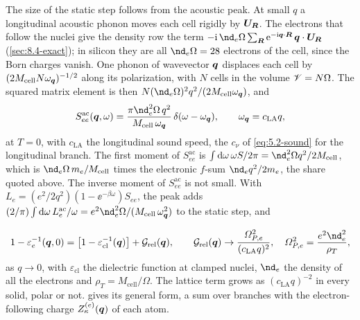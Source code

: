 The size of the static step follows from the acoustic peak. At small $q$ a longitudinal acoustic phonon moves each cell rigidly by $\bm{U}_{\bm{R}}$. The electrons that follow the nuclei give the density row the term $-\ii\,\nd_e\Omega\sum_{\vect{R}}\ee^{-\ii\vect{q}\cdot\vect{R}}\,\vect{q}\cdot\vect{U}_{\vect{R}}$ (\cref{sec:8.4-exact}); in silicon they are all $\nd_e\Omega = 28$ electrons of the cell, since the Born charges vanish. One phonon of wavevector $\bm{q}$ displaces each cell by $(2M_{\mathrm{cell}}N\omega_{\bm{q}})^{-1/2}$ along its polarization, with $N$ cells in the volume $\mathscr{V} = N\Omega$. The squared matrix element is then $N(\nd_e\Omega)^2q^2/(2M_{\mathrm{cell}}\omega_{\vect{q}})$, and
\begin{equation*}
  S_{ee}^{\mathrm{ac}}(\vect{q},\omega) = \frac{\pi\nd_e^2\Omega\,q^2}{M_{\mathrm{cell}}\,\omega_{\vect{q}}}\,\delta(\omega - \omega_{\vect{q}}) , \qquad \omega_{\vect{q}} = c_{\mathrm{LA}}q ,
\end{equation*}
at $T = 0$, with $c_{\mathrm{LA}}$ the longitudinal sound speed, the $c_\nu$ of \cref{eq:5.2-sound} for the longitudinal branch. The first moment of $S_{ee}^{\mathrm{ac}}$ is $\int\dd\omega\,\omega S/2\pi = \nd_e^2\Omega q^2/2M_{\mathrm{cell}}$, which is $\nd_e\Omega\,m_e/M_{\mathrm{cell}}$ times the electronic $f$-sum $\nd_eq^2/2m_e$, the share quoted above. The inverse moment of $S_{ee}^{\mathrm{ac}}$ is not small. With $L_e = (e^2/2q^2)(1 - \ee^{-\beta\omega})S_{ee}$, the peak adds $(2/\pi)\int\dd\omega\,L_e^{\mathrm{ac}}/\omega = e^2\nd_e^2\Omega/(M_{\mathrm{cell}}\,\omega_{\vect{q}}^2)$ to the static step, and
\begin{keyresult}
\begin{equation}
  1 - \varepsilon_e^{-1}(\vect{q},0) = \bigl[1 - \varepsilon_{\mathrm{cl}}^{-1}(\vect{q})\bigr] + \mathcal{G}_{\mathrm{rel}}(\vect{q}) , \qquad
  \mathcal{G}_{\mathrm{rel}}(\vect{q}) \to \frac{\varOmega_{P,e}^2}{(c_{\mathrm{LA}}q)^2} , \quad \varOmega_{P,e}^2 = \frac{e^2\nd_e^2}{\rho_T} ,
  \label{eq:10.2-relaxed}
\end{equation}
as $q \to 0$, with $\varepsilon_{\mathrm{cl}}$ the dielectric function at clamped nuclei, $\nd_e$ the density of all the electrons and $\rho_T = M_{\mathrm{cell}}/\Omega$. The lattice term grows as $(c_{\mathrm{LA}}q)^{-2}$ in every solid, polar or not.  gives its general form, a sum over branches with the electron-following charge $Z^{(e)}_\kappa(\bm{q})$ of each atom.
\end{keyresult}
